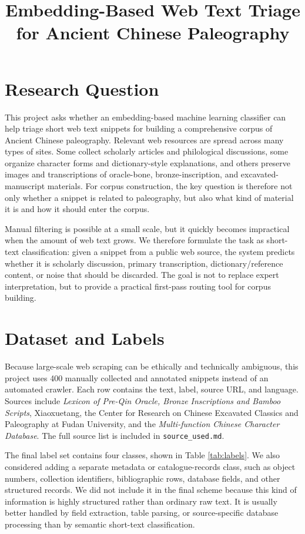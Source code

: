 \documentclass[11pt,a4paper]{article}
\title{\textbf{Embedding-Based Web Text Triage for Ancient Chinese Paleography}}
\author{}
\date{}
\begin{document}
\maketitle
\vspace{-1.4em}

\section{Research Question}

This project asks whether an embedding-based machine learning classifier can help triage short web text snippets for building a comprehensive corpus of Ancient Chinese paleography. Relevant web resources are spread across many types of sites. Some collect scholarly articles and philological discussions, some organize character forms and dictionary-style explanations, and others preserve images and transcriptions of oracle-bone, bronze-inscription, and excavated-manuscript materials. For corpus construction, the key question is therefore not only whether a snippet is related to paleography, but also what kind of material it is and how it should enter the corpus.

Manual filtering is possible at a small scale, but it quickly becomes impractical when the amount of web text grows. We therefore formulate the task as short-text classification: given a snippet from a public web source, the system predicts whether it is scholarly discussion, primary transcription, dictionary/reference content, or noise that should be discarded. The goal is not to replace expert interpretation, but to provide a practical first-pass routing tool for corpus building.

\section{Dataset and Labels}

Because large-scale web scraping can be ethically and technically ambiguous, this project uses 400 manually collected and annotated snippets instead of an automated crawler. Each row contains the text, label, source URL, and language. Sources include \textit{Lexicon of Pre-Qin Oracle, Bronze Inscriptions and Bamboo Scripts}, Xiaoxuetang, the Center for Research on Chinese Excavated Classics and Paleography at Fudan University, and the \textit{Multi-function Chinese Character Database}. The full source list is included in \texttt{source\_used.md}.

The final label set contains four classes, shown in Table \ref{tab:labels}. We also considered adding a separate metadata or catalogue-records class, such as object numbers, collection identifiers, bibliographic rows, database fields, and other structured records. We did not include it in the final scheme because this kind of information is highly structured rather than ordinary raw text. It is usually better handled by field extraction, table parsing, or source-specific database processing than by semantic short-text classification.
\end{document}
